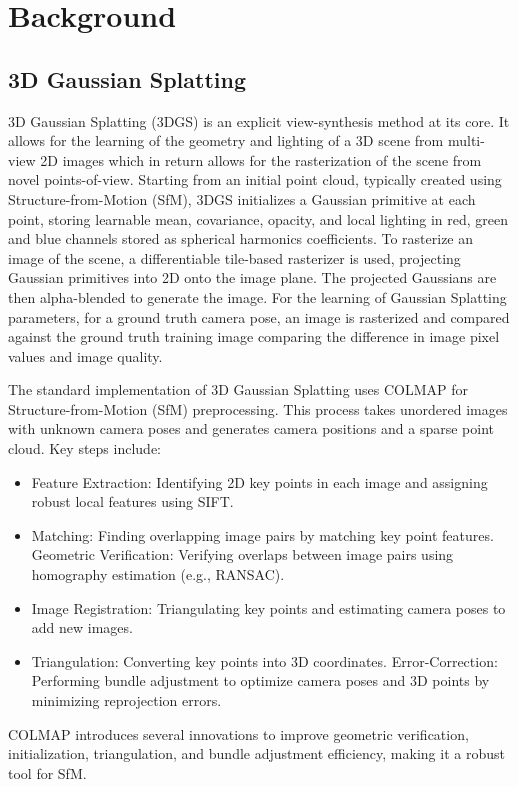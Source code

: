 \section{Background}
\subsection{3D Gaussian Splatting}
3D Gaussian Splatting (3DGS) \cite{2023gaussian_splatting} is an explicit view-synthesis method at its core. It allows for the learning of the geometry and lighting of a 3D scene from multi-view 2D images which in return allows for the rasterization of the scene from novel points-of-view. Starting from an initial point cloud, typically created using Structure-from-Motion (SfM), 3DGS initializes a Gaussian primitive at each point, storing learnable mean, covariance, opacity, and local lighting in red, green and blue channels stored as spherical harmonics coefficients. To rasterize an image of the scene, a differentiable tile-based rasterizer is used, projecting Gaussian primitives into 2D onto the image plane. The projected Gaussians are then alpha-blended to generate the image. For the learning of Gaussian Splatting parameters, for a ground truth camera pose, an image is rasterized and compared against the ground truth training image comparing the difference in image pixel values and image quality.

The standard implementation of 3D Gaussian Splatting uses COLMAP \cite{2016COLMAP} for Structure-from-Motion (SfM) preprocessing. This process takes unordered images with unknown camera poses and generates camera positions and a sparse point cloud. Key steps include:

\begin{itemize}
    \item Feature Extraction: Identifying 2D key points in each image and assigning robust local features using SIFT.
    \item Matching: Finding overlapping image pairs by matching key point features.
Geometric Verification: Verifying overlaps between image pairs using homography estimation (e.g., RANSAC).
    \item Image Registration: Triangulating key points and estimating camera poses to add new images.
    \item Triangulation: Converting key points into 3D coordinates.
Error-Correction: Performing bundle adjustment to optimize camera poses and 3D points by minimizing reprojection errors.
\end{itemize}
COLMAP introduces several innovations to improve geometric verification, initialization, triangulation, and bundle adjustment efficiency, making it a robust tool for SfM.

